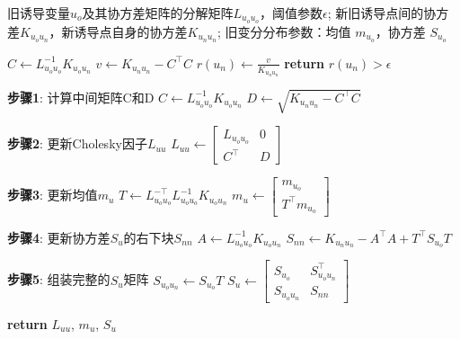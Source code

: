 \begin{algorithm}[htbp]
    \caption{诱导点增量更新}
    \label{alg:add_new_inducing}
    \begin{algorithmic}[1]
        \Require 
        \Statex 旧诱导变量$u_o$及其协方差矩阵的分解矩阵$L_{u_o u_o}$，阈值参数$\epsilon$;
        新旧诱导点间的协方差$K_{u_o u_n}$，新诱导点自身的协方差$K_{u_n u_n}$;
        旧变分分布参数：均值 $m_{u_o}$，协方差 $S_{u_o}$

            \State $C \gets L_{u_o u_o}^{-1} K_{u_o u_n}$
            \State $v \gets K_{u_n u_n} - C^\top C$
            \State $r(u_n) \gets \frac{v}{K_{u_n u_n}}$
            \State \textbf{return} $r(u_n) > \epsilon$
        \EndFunction

            
            \State \textbf{步骤1}: 计算中间矩阵C和D
            \State $C \gets L_{u_o u_o}^{-1} K_{u_o u_n}$
            \State $D \gets \sqrt{K_{u_n u_n} - C^\top C}$
            
            \State \textbf{步骤2}: 更新Cholesky因子$L_{uu}$
            \State $L_{uu} \gets \begin{bmatrix} L_{u_o u_o} & 0 \\ C^\top & D \end{bmatrix}$
            
            \State \textbf{步骤3}: 更新均值$m_u$
            \State $T \gets L_{u_o u_o}^{-\top} L_{u_o u_o}^{-1} K_{u_o u_n}$ 
            \State $m_u \gets \begin{bmatrix} m_{u_o} \\ T^\top m_{u_o} \end{bmatrix}$
            
            \State \textbf{步骤4}: 更新协方差$S_u$的右下块$S_{nn}$
            \State $A \gets L_{u_o u_o}^{-1} K_{u_o u_n}$ 
            \State $S_{nn} \gets K_{u_n u_n} - A^\top A + T^\top S_{u_o} T$
            
            \State \textbf{步骤5}: 组装完整的$S_u$矩阵
            \State $S_{u_o u_n} \gets S_{u_o} T$
            \State $S_u \gets \begin{bmatrix} S_{u_o} & S_{u_o u_n}^\top \\ S_{u_o u_n} & S_{nn} \end{bmatrix}$
            
            \State \textbf{return} $L_{uu}$, $m_u$, $S_u$
        \EndFunction
    \end{algorithmic}
\end{algorithm}

